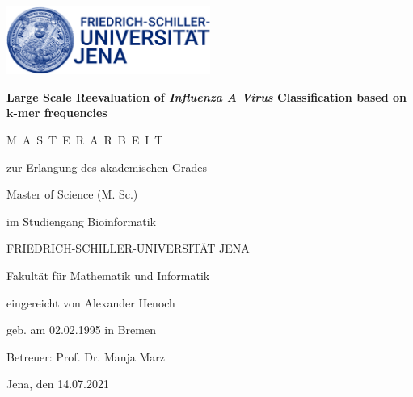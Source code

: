 \begin{titlepage}
    
    \centering 
    \large
    \includegraphics[width=0.5\textwidth]{Graphics/Logo.jpg}

    \vspace{6em}

    {\Large \textbf{Large Scale Reevaluation of \textit{Influenza A Virus} Classification based on $\bm{k}$-mer frequencies}}
    
    \vspace{6em}
    
    M~A~S~T~E~R~A~R~B~E~I~T
    
    \vspace{1em}
    
    zur Erlangung des akademischen Grades
    
    Master of Science (M. Sc.)
    
    im Studiengang Bioinformatik
    
    \vspace{1em}
    
    FRIEDRICH-SCHILLER-UNIVERSITÄT JENA
    
    Fakultät für Mathematik und Informatik
    
    \vfill
    
    eingereicht von Alexander Henoch
    
    geb. am 02.02.1995 in Bremen
    
    \vspace{1em}
    
    Betreuer: Prof. Dr. Manja Marz
    
    \vspace{1em}
    
    Jena, den 14.07.2021
    
\end{titlepage}